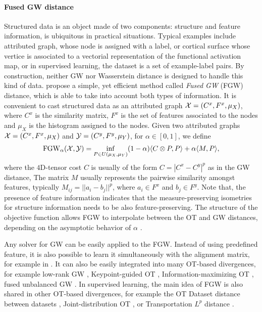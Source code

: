 \paragraph{Fused GW distance} Structured data is an object made of two components:
structure and feature information, is ubiquitous in practical situations.
Typical examples include attributed graph, whose node is assigned with a label, or
cortical surface whose vertice is associated to a vectorial representation of the
functional activation map, or in supervised learning, the dataset is a set of example-label pairs.
By construction, neither GW nor Wasserstein distance is designed to handle this kind of data.
\citet{Vayer19b} propose a simple, yet efficient method called
\textit{Fused GW} (FGW) distance, which is able to take into account both types of information.
It is convenient to cast structured data as an attributed graph $\mathcal X = (C^x, F^x, \mu_X)$,
where $C^x$ is the similarity matrix, $F^x$ is the set of features associated to the nodes and
$\mu_X$ is the histogram assigned to the nodes. Given two attributed graphs
$\mathcal X = (C^x, F^x, \mu_X)$ and $\mathcal Y = (C^y, F^y, \mu_Y)$, for $\alpha \in [0, 1]$, we define
\begin{align}
  \text{FGW}_{\alpha}(\mathcal X, \mathcal Y) = \inf_{P \in U(\mu_X, \mu_Y)}
  (1 - \alpha) \langle C \otimes P, P \rangle + \alpha \langle M, P \rangle,
\end{align}
where the $4$D-tensor cost $C$ is usually of the form $C = |C^x - C^y|^p$ as in the GW distance,
The matrix $M$ usually represents the pairwise similarity amongst features, typically
$M_{ij} = || a_i - b_j||^p$, where $a_i \in F^x$ and $b_j \in F^y$. Note that,
the presence of feature information indicates that the measure-preserving isometries
for structure information needs to be also feature-preserving.
The structure of the objective function allows FGW to interpolate
between the OT and GW distances, depending on the asymptotic behavior of $\alpha$ \citep{Vayer19b}.

Any solver for GW can be easily applied to the FGW. Instead of using predefined feature,
it is also possible to learn it simultaneously with the alignment matrix,
for example in \citep{Xu19}. It can also be easily integrated into many OT-based divergences,
for example low-rank GW \citep{Meyer21b},
Keypoint-guided OT \citep{Gu22}, Information-maximizing OT \citep{Chuang23},
fused unbalanced GW \citep{Thual22}.
In supervised learning, the main idea of FGW is also shared in other OT-based divergences,
for example the OT Dataset distance between datasets \citep{Melis20},
Joint-distribution OT \citep{Courty17}, or Transportation $L^p$ distance \citep{Thorpe17}.


